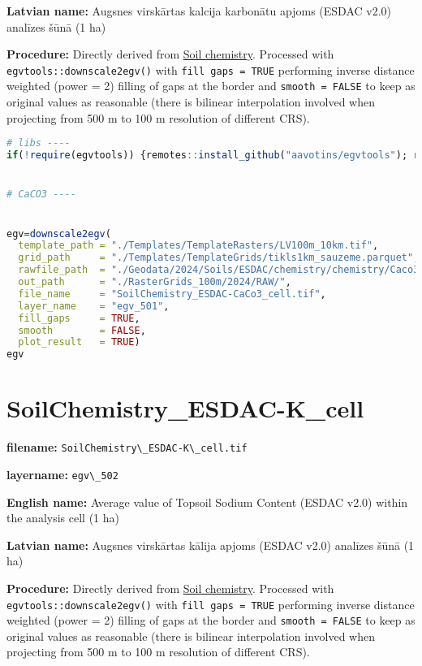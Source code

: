 \documentclass[
]{book}
\newcommand{\passthrough}[1]{#1}
\begin{document}
\textbf{Latvian name:} Augsnes virskārtas kalcija karbonātu apjoms (ESDAC v2.0) analīzes šūnā (1 ha)

\textbf{Procedure:} Directly derived from \hyperref[Ch04.07.01]{Soil chemistry}. Processed
with \passthrough{\lstinline!egvtools::downscale2egv()!} with \passthrough{\lstinline!fill gaps = TRUE!} performing inverse
distance weighted (power = 2) filling of gaps at the border and \passthrough{\lstinline!smooth = FALSE!}
to keep as original values as reasonable (there is bilinear interpolation
involved when projecting from 500 m to 100 m resolution of different CRS).

\begin{lstlisting}[language=R]
# libs ----
if(!require(egvtools)) {remotes::install_github("aavotins/egvtools"); require(egvtools)}


# CaCO3 ----


egv=downscale2egv(
  template_path = "./Templates/TemplateRasters/LV100m_10km.tif",
  grid_path     = "./Templates/TemplateGrids/tikls1km_sauzeme.parquet",
  rawfile_path  = "./Geodata/2024/Soils/ESDAC/chemistry/chemistry/Caco3/CaCO3.tif",
  out_path      = "./RasterGrids_100m/2024/RAW/",
  file_name     = "SoilChemistry_ESDAC-CaCo3_cell.tif",
  layer_name    = "egv_501",
  fill_gaps     = TRUE,
  smooth        = FALSE,
  plot_result   = TRUE)
egv
\end{lstlisting}

\section{SoilChemistry\_ESDAC-K\_cell}\label{ch06.502}

\textbf{filename:} \passthrough{\lstinline!SoilChemistry\_ESDAC-K\_cell.tif!}

\textbf{layername:} \passthrough{\lstinline!egv\_502!}

\textbf{English name:} Average value of Topsoil Sodium Content (ESDAC v2.0) within the analysis cell (1 ha)

\textbf{Latvian name:} Augsnes virskārtas kālija apjoms (ESDAC v2.0) analīzes šūnā (1 ha)

\textbf{Procedure:} Directly derived from \hyperref[Ch04.07.01]{Soil chemistry}. Processed
with \passthrough{\lstinline!egvtools::downscale2egv()!} with \passthrough{\lstinline!fill gaps = TRUE!} performing inverse
distance weighted (power = 2) filling of gaps at the border and \passthrough{\lstinline!smooth = FALSE!}
to keep as original values as reasonable (there is bilinear interpolation
involved when projecting from 500 m to 100 m resolution of different CRS).
\end{document}
